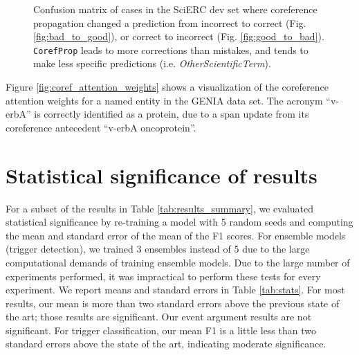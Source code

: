 \documentclass[11pt,a4paper]{article}
\begin{document}
\begin{figure}[t]
  \centering


  \caption{
    Confusion matrix of cases in the SciERC dev set where coreference propagation changed a prediction from incorrect to correct (Fig. \ref{fig:bad_to_good}), or correct to incorrect (Fig. \ref{fig:good_to_bad}). \texttt{CorefProp} leads to more corrections than mistakes, and tends to make less specific predictions (i.e. \emph{OtherScientificTerm}).
  }
  \label{fig:coref_prop_confusion}
\end{figure}
 

Figure \ref{fig:coref_attention_weights} shows a visualization of the coreference attention weights for a named entity in the GENIA data set. The acronym ``v-erbA'' is correctly identified as a protein, due to a span update from its coreference antecedent ``v-erbA oncoprotein''.

\section{Statistical significance of results} \label{sec:stats}

For a subset of the results in Table \ref{tab:results_summary}, we evaluated statistical significance by re-training a model with 5 random seeds and computing the mean and standard error of the mean of the F1 scores. For ensemble models (trigger detection), we trained 3 ensembles instead of 5 due to the large computational demands of training ensemble models. Due to the large number of experiments performed, it was impractical to perform these tests for every experiment. We report means and standard errors in Table \ref{tab:stats}. For most results, our mean is more than two standard errors above the previous state of the art; those results are significant. Our event argument results are  not significant. For trigger classification, our mean F1 is a little less than two standard errors above the state of the art, indicating moderate significance.


\end{document}
